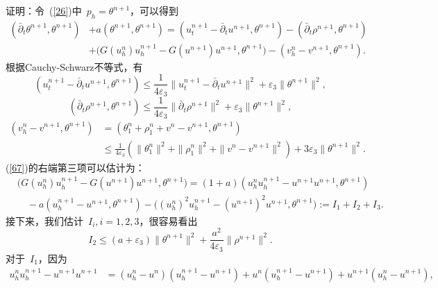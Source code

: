 \documentclass[twoside,UTF8]{nputhesis}
\begin{document}
证明：令~(\ref{26})中~$p_h=\theta^{n+1}$，可以得到
\begin{equation}
\begin{split}
(\bar{\partial}_t\theta^{n+1},\theta^{n+1})&+a(\theta^{n+1},\theta^{n+1})=(u_t^{n+1}-\bar{\partial}_tu^{n+1},\theta^{n+1})-(\bar{\partial}_t\rho^{n+1},\theta^{n+1})\\
&+\Big(G(u^n_h)u^{n+1}_h-G(u^{n+1})u^{n+1},\theta^{n+1}\Big)-(v_h^n-v^{n+1},\theta^{n+1}).
\label{67}
\end{split}
\end{equation}
根据Cauchy-Schwarz不等式，有
\begin{equation}
(u_t^{n+1}-\bar{\partial}_tu^{n+1},\theta^{n+1})\leq \frac{1}{4\varepsilon_3}\| u_t^{n+1}-\bar{\partial}_tu^{n+1}\|^2+\varepsilon_3\| \theta^{n+1}\|^2,
\label{68}
\end{equation}
\begin{equation}
(\bar{\partial}_t\rho^{n+1},\theta^{n+1})\leq \frac{1}{4\varepsilon_3}\|\bar{\partial}_t\rho^{n+1}\|^2+\varepsilon_3\|\theta^{n+1}\|^2,
\label{69}
\end{equation}
\begin{equation}
\begin{split}
(v_h^n-v^{n+1},\theta^{n+1})&=(\theta^n_1+\rho^n_1+v^n-v^{n+1},\theta^{n+1})\\
&\leq \frac{1}{4\varepsilon_3}(\| \theta^n_1\|^2+\| \rho^n_1\|^2+\| v^n-v^{n+1}\|^2)+3\varepsilon_3\| \theta^{n+1}\|^2.
\label{70}
\end{split}
\end{equation}
(\ref{67})的右端第三项可以估计为：
\begin{equation*}
\begin{split}
&\Big(G(u^n_h)u^{n+1}_h-G(u^{n+1})u^{n+1},\theta^{n+1}\Big)=(1+a)(u^n_hu^{n+1}_h-u^{n+1}u^{n+1},\theta^{n+1})\\
&\quad-a(u^{n+1}_h-u^{n+1},\theta^{n+1})-\Big((u^n_h)^2u^{n+1}_h-(u^{n+1})^2u^{n+1},\theta^{n+1}\Big):=I_1+I_2+I_3.
\end{split}
\end{equation*}
接下来，我们估计~$I_i, i=1,2,3$，很容易看出
\begin{equation}\label{74}
I_2\leq (a+\varepsilon_3)\| \theta^{n+1}\|^2\!+\frac{a^2}{4\varepsilon_3}\| \rho^{n+1}\|^2.
\end{equation}
对于~$I_1$，因为
\begin{equation*}
\begin{split}
u^n_hu^{n+1}_h-u^{n+1}u^{n+1}&=(u^n_h-u^n)(u^{n+1}_h-u^{n+1})+u^n(u^{n+1}_h-u^{n+1})+u^{n+1}(u^n_h-u^{n+1}),
\end{split}
\end{equation*}
\end{document}
